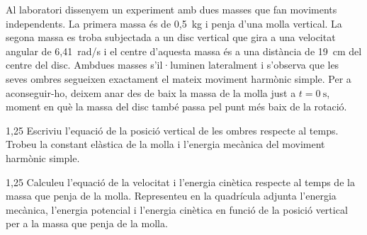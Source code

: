 Al laboratori dissenyem un experiment amb dues masses que fan moviments independents. La primera massa és de 0,5~kg i penja d'una molla vertical. La segona massa es troba subjectada a un disc vertical que gira a una velocitat angular de 6,41~rad/s i el centre d'aquesta massa és a una distància de 19~cm del centre del disc. Ambdues masses s'il·luminen lateralment i s'observa que les seves ombres segueixen exactament el mateix moviment harmònic simple. Per a aconseguir-ho, deixem anar des de baix la massa de la molla just a $t = 0\ \mathrm{s}$, moment en què la massa del disc també passa pel punt més baix de la rotació.


\begin{apartat}{1,25}
Escriviu l'equació de la posició vertical de les ombres respecte al temps. Trobeu la constant elàstica de la molla i l'energia mecànica del moviment harmònic simple.
\end{apartat}

\begin{apartat}{1,25}
Calculeu l'equació de la velocitat i l'energia cinètica respecte al temps de la massa que penja de la molla. Representeu en la quadrícula adjunta l'energia mecànica, l'energia potencial i l'energia cinètica en funció de la posició vertical per a la massa que penja de la molla.
\end{apartat}

